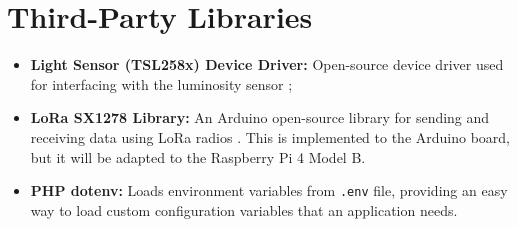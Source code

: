 \clearpage
\section{Third-Party Libraries}

\begin{itemize}
	\item \textbf{Light Sensor (TSL258x) Device Driver:} Open-source device driver used for interfacing with the luminosity sensor \cite{code_tsl};
	\item \textbf{LoRa SX1278 Library:} An Arduino open-source library for sending and receiving data using LoRa radios \cite{sx1278_lib}. This is implemented to the Arduino board, but it will be adapted to the Raspberry Pi 4 Model B.
	\item \textbf{PHP dotenv:} Loads environment variables from \verb|.env| file, providing an easy way to load custom configuration variables that an application needs. \cite{phpdotenv}
\end{itemize}
